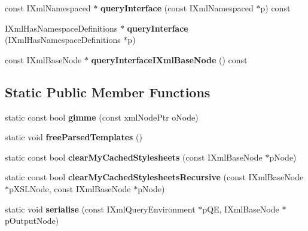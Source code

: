\begin{DoxyCompactItemize}
\item 
\hypertarget{classgeneral__server_1_1LibXslNode_a991403e384a9750abb43bfbf65a25fe8}{const \-I\-Xml\-Namespaced $\ast$ {\bfseries query\-Interface} (const \-I\-Xml\-Namespaced $\ast$p) const }\label{classgeneral__server_1_1LibXslNode_a991403e384a9750abb43bfbf65a25fe8}

\item 
\hypertarget{classgeneral__server_1_1LibXslNode_a771809e6e760971db042bf977523a0a6}{\-I\-Xml\-Has\-Namespace\-Definitions $\ast$ {\bfseries query\-Interface} (\-I\-Xml\-Has\-Namespace\-Definitions $\ast$p)}\label{classgeneral__server_1_1LibXslNode_a771809e6e760971db042bf977523a0a6}

\item 
\hypertarget{classgeneral__server_1_1LibXslNode_a6475db727915c35c8e96bcd2d7849f63}{const \-I\-Xml\-Base\-Node $\ast$ {\bfseries query\-Interface\-I\-Xml\-Base\-Node} () const }\label{classgeneral__server_1_1LibXslNode_a6475db727915c35c8e96bcd2d7849f63}

\end{DoxyCompactItemize}
\subsection*{\-Static \-Public \-Member \-Functions}
\begin{DoxyCompactItemize}
\item 
\hypertarget{classgeneral__server_1_1LibXslNode_a585682e1af7c953a4f4626a94351414a}{static const bool {\bfseries gimme} (const xml\-Node\-Ptr o\-Node)}\label{classgeneral__server_1_1LibXslNode_a585682e1af7c953a4f4626a94351414a}

\item 
\hypertarget{classgeneral__server_1_1LibXslNode_a14c39504f243787527ed75238d0fe468}{static void {\bfseries free\-Parsed\-Templates} ()}\label{classgeneral__server_1_1LibXslNode_a14c39504f243787527ed75238d0fe468}

\item 
\hypertarget{classgeneral__server_1_1LibXslNode_a2088a46f9a17247f6b220bb8d7ae9478}{static const bool {\bfseries clear\-My\-Cached\-Stylesheets} (const \-I\-Xml\-Base\-Node $\ast$p\-Node)}\label{classgeneral__server_1_1LibXslNode_a2088a46f9a17247f6b220bb8d7ae9478}

\item 
\hypertarget{classgeneral__server_1_1LibXslNode_a1f54dcd6988f3bebecf72ccb03b0db27}{static const bool {\bfseries clear\-My\-Cached\-Stylesheets\-Recursive} (const \-I\-Xml\-Base\-Node $\ast$p\-X\-S\-L\-Node, const \-I\-Xml\-Base\-Node $\ast$p\-Node)}\label{classgeneral__server_1_1LibXslNode_a1f54dcd6988f3bebecf72ccb03b0db27}

\item 
\hypertarget{classgeneral__server_1_1LibXslNode_ab843e5a58b1e2baad2e6884f10f66884}{static void {\bfseries serialise} (const \-I\-Xml\-Query\-Environment $\ast$p\-Q\-E, \-I\-Xml\-Base\-Node $\ast$p\-Output\-Node)}\label{classgeneral__server_1_1LibXslNode_ab843e5a58b1e2baad2e6884f10f66884}

\end{DoxyCompactItemize}
